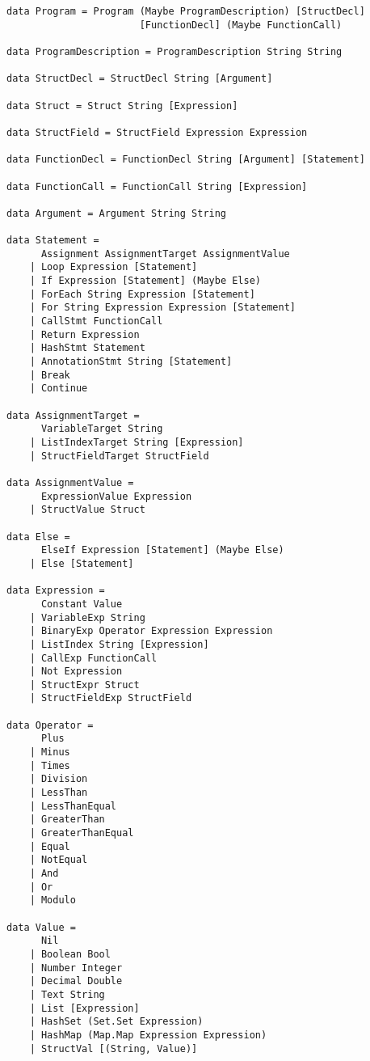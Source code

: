 \begin{lstlisting}[caption={Psnodig's data types in Haskell.}, captionpos=b, label={Psnodig's data types in Haskell.}]
data Program = Program (Maybe ProgramDescription) [StructDecl]
                       [FunctionDecl] (Maybe FunctionCall)

data ProgramDescription = ProgramDescription String String

data StructDecl = StructDecl String [Argument]

data Struct = Struct String [Expression]

data StructField = StructField Expression Expression

data FunctionDecl = FunctionDecl String [Argument] [Statement]

data FunctionCall = FunctionCall String [Expression]

data Argument = Argument String String

data Statement =
      Assignment AssignmentTarget AssignmentValue
    | Loop Expression [Statement]
    | If Expression [Statement] (Maybe Else)
    | ForEach String Expression [Statement]
    | For String Expression Expression [Statement]
    | CallStmt FunctionCall
    | Return Expression
    | HashStmt Statement
    | AnnotationStmt String [Statement]
    | Break
    | Continue

data AssignmentTarget =
      VariableTarget String
    | ListIndexTarget String [Expression]
    | StructFieldTarget StructField

data AssignmentValue =
      ExpressionValue Expression
    | StructValue Struct

data Else =
      ElseIf Expression [Statement] (Maybe Else)
    | Else [Statement]

data Expression =
      Constant Value
    | VariableExp String
    | BinaryExp Operator Expression Expression
    | ListIndex String [Expression]
    | CallExp FunctionCall
    | Not Expression
    | StructExpr Struct
    | StructFieldExp StructField

data Operator =
      Plus
    | Minus
    | Times
    | Division
    | LessThan
    | LessThanEqual
    | GreaterThan
    | GreaterThanEqual
    | Equal
    | NotEqual
    | And
    | Or
    | Modulo

data Value =
      Nil
    | Boolean Bool
    | Number Integer
    | Decimal Double
    | Text String
    | List [Expression]
    | HashSet (Set.Set Expression)
    | HashMap (Map.Map Expression Expression)
    | StructVal [(String, Value)]
\end{lstlisting}

